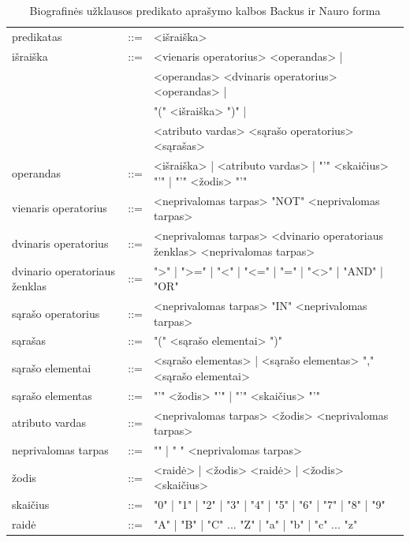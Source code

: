 \begin{table}[H]\footnotesize
	\centering
	\begin{tabular}{|l c l|}
		\hline
		predikatas                    & ::= & <išraiška> \\
		išraiška                      & ::= & <vienaris operatorius> <operandas> | \\
									  &     & \multicolumn{1}{l|}{<operandas> <dvinaris operatorius> <operandas> |} \\
									  &     & \multicolumn{1}{l|}{"(" <išraiška> ")" |} \\
									  &     & \multicolumn{1}{l|}{ <atributo vardas> <sąrašo operatorius> <sąrašas>} \\
		operandas                     & ::= & <išraiška> | <atributo vardas> | "'" <skaičius> "'" | "'" <žodis> "'" \\
		vienaris operatorius          & ::= & <neprivalomas tarpas> "NOT" <neprivalomas tarpas> \\
		dvinaris operatorius          & ::= & <neprivalomas tarpas> <dvinario operatoriaus ženklas> <neprivalomas tarpas> \\
		dvinario operatoriaus ženklas & ::= & ">" | ">=" | "<" | "<=" | "=" | "<>" | "AND" | "OR" \\
		sąrašo operatorius            & ::= & <neprivalomas tarpas> "IN" <neprivalomas tarpas> \\
		sąrašas                       & ::= & "(" <sąrašo elementai> ")" \\
		sąrašo elementai              & ::= & <sąrašo elementas> | <sąrašo elementas> "," <sąrašo elementai> \\
		sąrašo elementas              & ::= & "'" <žodis> "'" | "'" <skaičius> "'" \\
		atributo vardas               & ::= & <neprivalomas tarpas> <žodis> <neprivalomas tarpas> \\
		neprivalomas tarpas           & ::= & "" | " " <neprivalomas tarpas> \\
		žodis                         & ::= & <raidė> | <žodis> <raidė> | <žodis> <skaičius> \\
		skaičius                      & ::= & "0" | "1" | "2" | "3" | "4" | "5" | "6" | "7" | "8" | "9" \\
		raidė                         & ::= & "A" | "B" | "C" ... "Z" | "a" | "b" | "c" ... "z"  \\
		\hline
	\end{tabular}
	\caption{Biografinės užklausos predikato aprašymo kalbos Backus ir Nauro forma}
	\label{tab:queryBNF}
\end{table}

